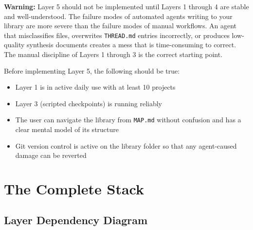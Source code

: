\documentclass[12pt,letterpaper]{article}
\begin{document}
\begin{mdframed}[style=warnbox]
\textbf{Warning:} Layer 5 should not be implemented until Layers 1 through 4
are stable and well-understood. The failure modes of automated agents
writing to your library are more severe than the failure modes of manual
workflows. An agent that misclassifies files, overwrites \texttt{THREAD.md}
entries incorrectly, or produces low-quality synthesis documents creates
a mess that is time-consuming to correct. The manual discipline of
Layers 1 through 3 is the correct starting point.
\end{mdframed}

Before implementing Layer 5, the following should be true:

\begin{itemize}
  \item Layer 1 is in active daily use with at least 10 projects
  \item Layer 3 (scripted checkpoints) is running reliably
  \item The user can navigate the library from \texttt{MAP.md} without
        confusion and has a clear mental model of its structure
  \item Git version control is active on the library folder so that
        any agent-caused damage can be reverted
\end{itemize}

\section{The Complete Stack}

\subsection{Layer Dependency Diagram}
\end{document}
